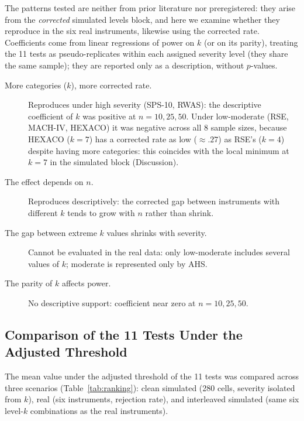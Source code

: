 \documentclass[man,mask,donotrepeattitle,floatsintext]{apa7}
\begin{document}
The patterns tested are neither from prior literature nor preregistered: they arise from the \emph{corrected} simulated levels block, and here we examine whether they reproduce in the six real instruments, likewise using the corrected rate. Coefficients come from linear regressions of power on $k$ (or on its parity), treating the 11 tests as pseudo-replicates within each assigned severity level (they share the same sample); they are reported only as a description, without $p$-values.

\begin{description}
\item[More categories ($k$), more corrected rate.] Reproduces under high severity (SPS-10, RWAS): the descriptive coefficient of $k$ was positive at $n=10,25,50$. Under low-moderate (RSE, MACH-IV, HEXACO) it was negative across all 8 sample sizes, because HEXACO ($k=7$) has a corrected rate as low ($\approx.27$) as RSE's ($k=4$) despite having more categories: this coincides with the local minimum at $k=7$ in the simulated block (Discussion).
\item[The effect depends on $n$.] Reproduces descriptively: the corrected gap between instruments with different $k$ tends to grow with $n$ rather than shrink.
\item[The gap between extreme $k$ values shrinks with severity.] Cannot be evaluated in the real data: only low-moderate includes several values of $k$; moderate is represented only by AHS.
\item[The parity of $k$ affects power.] No descriptive support: coefficient near zero at $n=10,25,50$.
\end{description}

\subsection{Comparison of the 11 Tests Under the Adjusted Threshold}
\label{sec:res-comparacion}

The mean value under the adjusted threshold of the 11 tests was compared across three scenarios (Table~\ref{tab:ranking}): clean simulated (280 cells, severity isolated from $k$), real (six instruments, rejection rate), and interleaved simulated (same six level-$k$ combinations as the real instruments).
\end{document}
